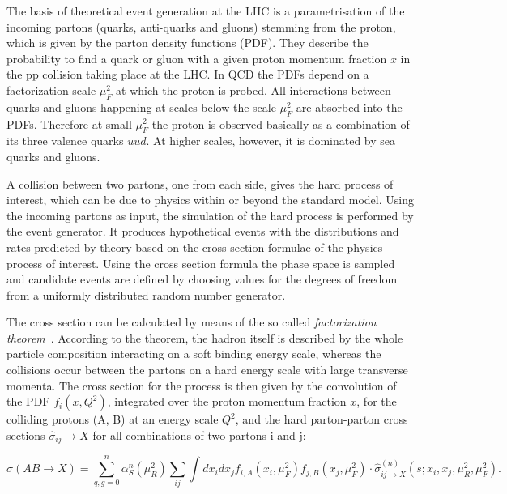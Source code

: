 The basis of theoretical event generation at the LHC is a parametrisation of the incoming partons (quarks, anti-quarks and gluons) stemming from the proton, which is given by the parton density functions (PDF).
They describe the probability to find a quark or gluon with a given proton momentum fraction $x$ in the pp collision taking place at the LHC.
In QCD the PDFs depend on a factorization scale $\mu^2_F$ at which the proton is probed.
All interactions between quarks and gluons happening at scales below the scale $\mu^2_F$ are absorbed into the PDFs. Therefore at small $\mu^2_F$ the proton is observed basically as a combination of its
three valence quarks $uud$. At higher scales, however, it is dominated by sea quarks and gluons.

A collision between two partons, one from each side, gives the hard process of interest, which can be due to physics within or beyond the standard model.
Using the incoming partons as input, the simulation of the hard process is performed by the event generator.
It produces hypothetical events with the distributions and rates predicted by theory based on the cross section formulae of the physics process of interest.
Using the cross section formula the phase space is sampled and candidate events are defined by choosing values for the degrees of freedom from a uniformly distributed random number generator.

The cross section can be calculated by means of the so called \textit{factorization theorem}~\cite{Collins:1987pm}.
According to the theorem, the hadron itself is described by the whole particle composition interacting on a soft binding energy scale,
whereas the collisions occur between the partons on a hard energy scale with large transverse momenta.
The cross section for the process is then given by the convolution of the PDF $f_i(x,Q^2)$, integrated over the proton momentum fraction $x$, for the colliding protons (A, B) at an energy scale $Q^2$,
and the hard parton-parton cross sections $\hat{\sigma}_{ij} \to X$ for all combinations of two partons i and j:

\begin{equation}
\sigma(AB \to X) = \sum_{q,g=0}^{n} \alpha_S^n(\mu_R^2)\sum_{ij}\int dx_i dx_j f_{i,A}(x_i,\mu_F^2) f_{j,B}(x_j,\mu_F^2) \cdot \hat{\sigma}^{(n)}_{ij\to X}(s;x_i,x_j,\mu_R^2,\mu_F^2).
\end{equation}

